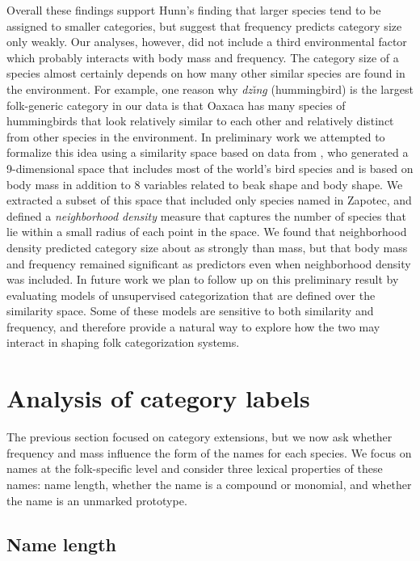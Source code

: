 \documentclass[10pt,letterpaper]{article}
\begin{document}
Overall these findings support Hunn's finding that larger species tend to be assigned to smaller categories, but suggest that frequency predicts category size only weakly. Our analyses, however,  did not include a third environmental factor  which probably interacts with body mass and frequency. The category size of a species almost certainly depends on how many other similar species are found in the environment. For example, one reason why \textit{dz\v{\i}n\b{g}} (hummingbird) is the largest folk-generic category in our data is that Oaxaca has many species of hummingbirds that look relatively similar to each other and relatively distinct from other species in the environment. In preliminary work we attempted to formalize this idea using a similarity space based on data from , who generated a 9-dimensional space that includes most of the world's bird species and is based on body mass in addition to 8 variables related to beak shape and body shape. We extracted a subset of this space that included only species named in Zapotec, and defined a \emph{neighborhood density} measure that captures the number of species that lie within a small radius of each point in the space. We found that neighborhood density predicted category size about as strongly than mass, but that body mass and frequency remained significant as predictors even when neighborhood density was included. In future work we plan to follow up on this preliminary result by evaluating models of unsupervised categorization that are defined over the similarity space. Some of these models are sensitive to both similarity and frequency, and therefore provide a natural way to explore how the two may interact in shaping folk categorization systems.

\section{Analysis of category labels}

The previous section focused on category extensions, but we now ask whether frequency and mass influence the form of the names for each species. We focus on names at the folk-specific level and consider three lexical properties of these names: name length, whether the name is a compound or monomial, and whether the name is an unmarked prototype.

\subsection{Name length}
\end{document}
